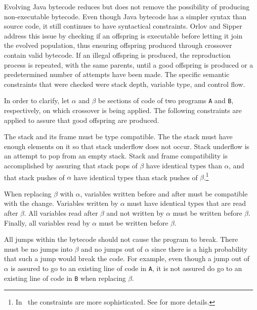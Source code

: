 \documentclass{sig-alternate}
\begin{document}
Evolving Java bytecode reduces but does not remove the possibility of producing non-executable bytecode. Even though Java bytecode has a simpler syntax than source code, it still continues to have syntactical constraints. Orlov and Sipper~\cite{FINCH2:2009} address this issue by checking if an offspring is executable before letting it join the evolved population, thus ensuring offspring produced through crossover contain valid bytecode. If an illegal offspring is produced, the reproduction process is repeated, with the same parents, until a good offspring is produced or a predetermined number of attempts have been made. The specific semantic constraints that were checked were stack depth, variable type, and control flow.\par

In order to clarify, let $\alpha$ and $\beta$ be sections of code of two programs \texttt{A} and \texttt{B}, respectively, on which crossover is being applied. The following constraints are applied to assure that good offspring are produced.\par

The stack and its frame must be type compatible. The the stack must have enough elements on it so that stack underflow does not occur. Stack underflow is an attempt to pop from an empty stack. Stack and frame compatibility is accomplished by assuring that stack pops of $\beta$ have identical types than $\alpha$, and that stack pushes of $\alpha$ have identical types than stack pushes of $\beta$.\footnote{In~\cite{FINCH2:2009} the constraints are more sophisticated. See \cite{FINCH2:2009} for more details.} \par

When replacing $\beta$ with $\alpha$, variables written before and after must be compatible with the change. Variables written by $\alpha$ must have identical types that are read after $\beta$. All variables read after $\beta$ and not written by $\alpha$ must be written before $\beta$. Finally, all variables read by $\alpha$ must be written before $\beta$.\par

All jumps within the bytecode should not cause the program to break. There must be no jumps into $\beta$ and no jumps out of $\alpha$ since there is a high probability that such a jump would break the code. For example, even though a jump out of $\alpha$ is assured to go to an existing line of code in \texttt{A}, it is not assured do go to an existing line of code in \texttt{B} when replacing $\beta$.
\end{document}
